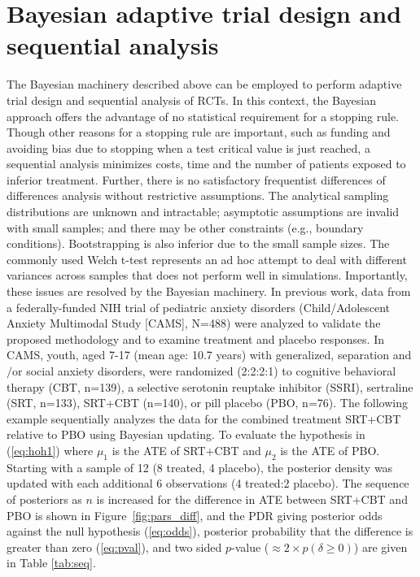 \documentclass{juliacon}
\begin{document}
\section{Bayesian adaptive trial design and sequential analysis}
The Bayesian machinery described above can be employed to perform adaptive trial design and sequential analysis of RCTs. In this context, the Bayesian approach offers the advantage of no statistical requirement for a stopping rule. Though other reasons for a stopping rule are important, such as funding and avoiding bias due to stopping when a test critical value is just reached, a sequential analysis minimizes costs, time and the number of patients exposed to inferior treatment. Further, there is no satisfactory frequentist differences of differences analysis without restrictive assumptions. The analytical sampling distributions are unknown and intractable; asymptotic assumptions are invalid with small samples; and there may be other constraints (e.g., boundary conditions). Bootstrapping is also inferior due to the small sample sizes. The commonly used Welch t-test represents an ad hoc attempt to deal with different variances across samples that does not perform well in simulations\cite{Mills2019}.  Importantly, these issues are resolved by the Bayesian machinery.
\vskip 6pt
In previous work\cite{Strawn2018,Mills2019}, data from a federally-funded NIH trial of pediatric anxiety disorders (Child/Adolescent Anxiety Multimodal Study [CAMS], N=488) were analyzed to validate the proposed methodology and to examine treatment and placebo responses. In CAMS, youth, aged 7-17 (mean age: 10.7 years) with generalized, separation and$/$or social anxiety disorders, were randomized (2:2:2:1) to cognitive behavioral therapy (CBT, n=139), a selective serotonin reuptake inhibitor (SSRI), sertraline (SRT, n=133), SRT+CBT (n=140), or pill placebo (PBO, n=76).
\vskip 6pt
The following example sequentially analyzes the data for the combined treatment SRT+CBT relative to PBO using Bayesian updating.  To evaluate the hypothesis in (\ref{eq:hoh1}) where $\mu_1$ is the ATE of SRT+CBT and $\mu_2$ is the ATE of PBO. Starting with a sample of 12 (8 treated, 4 placebo), the posterior density was updated with each additional 6 observations (4 treated:2 placebo).  The sequence of posteriors as $n$ is increased for the difference in ATE between SRT+CBT and PBO is shown in Figure~\ref{fig:pars_diff}, and the PDR giving posterior odds against the null hypothesis (\ref{eq:odds}), posterior probability that the difference is greater than zero (\ref{eq:pval}), and two sided $p$-value ($\approx 2\times p(\delta \ge 0)$) are given in Table \ref{tab:seq}.
\end{document}
